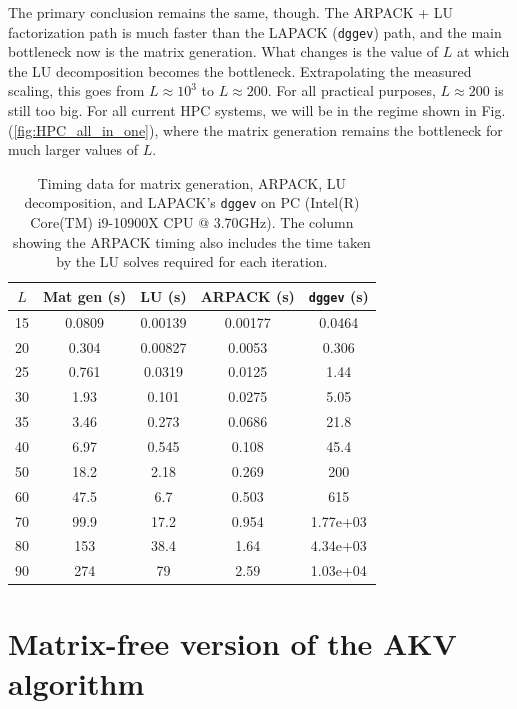 \documentclass{iopjournal}
\begin{document}
The primary conclusion remains the same, though. The ARPACK + LU factorization path is much faster than the LAPACK (\texttt{dggev}) path, and the main bottleneck now is the matrix generation. What changes is the value of $L$ at which the LU decomposition becomes the bottleneck. Extrapolating the measured scaling, this goes from $L\approx 10^3$ to $L \approx 200$. For all practical purposes, $L \approx 200$ is still too big. For all current HPC systems, we will be in the regime shown in Fig.(\ref{fig:HPC_all_in_one}), where the matrix generation remains the bottleneck for much larger values of $L$.

\begin{table}[h]
\centering
\begin{tabular}{c c c c c}
\toprule
$L$ & Mat gen (s) & LU (s) & ARPACK (s) & \texttt{dggev} (s) \\
\midrule
15 & 0.0809 & 0.00139 & 0.00177 & 0.0464 \\
20 & 0.304 & 0.00827 & 0.0053 & 0.306 \\
25 & 0.761 & 0.0319 & 0.0125 & 1.44 \\
30 & 1.93 & 0.101 & 0.0275 & 5.05 \\
35 & 3.46 & 0.273 & 0.0686 & 21.8 \\
40 & 6.97 & 0.545 & 0.108 & 45.4 \\
50 & 18.2 & 2.18 & 0.269 & 200 \\
60 & 47.5 & 6.7 & 0.503 & 615 \\
70 & 99.9 & 17.2 & 0.954 & 1.77e+03 \\
80 & 153 & 38.4 & 1.64 & 4.34e+03 \\
90 & 274 & 79 & 2.59 & 1.03e+04 \\
\bottomrule
\end{tabular}
\caption{Timing data for matrix generation, ARPACK, LU decomposition, and LAPACK's \texttt{dggev} on PC (Intel(R) Core(TM) i9-10900X CPU @ 3.70GHz).  The column showing the ARPACK timing also includes the time taken by the LU solves required for each iteration.}
\label{table:timing_data_PC}
\end{table}

\section{\label{sec:Matrix-free version of the AKV algorithm} Matrix-free version of the AKV algorithm}
\end{document}

